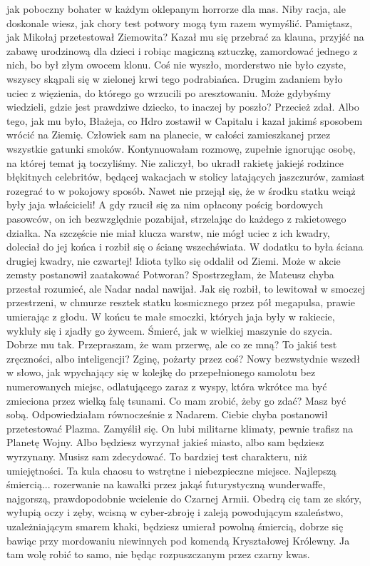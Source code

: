 \begin{dialogue}
jak poboczny bohater w każdym oklepanym horrorze dla mas.
\ds{} Niby racja, ale doskonale wiesz, jak chory test potwory mogą tym razem wymyślić.
Pamiętasz, jak Mikołaj przetestował Ziemowita? Kazał mu się przebrać za klauna, przyjść na zabawę urodzinową dla dzieci i robiąc magiczną sztuczkę, zamordować jednego z nich, bo był złym owocem klonu.
Coś nie wyszło, morderstwo nie było czyste, wszyscy skąpali się w zielonej krwi tego podrabiańca.
Drugim zadaniem było uciec z więzienia, do którego go wrzucili po aresztowaniu. Może gdybyśmy wiedzieli, gdzie jest prawdziwe dziecko, to inaczej by poszło?
\ds{} Przecież zdał.
\ds{} Albo tego, jak mu było, Błażeja, co Hdro zostawił w Capitalu i kazał jakimś sposobem wrócić na Ziemię.
Człowiek sam na planecie, w całości zamieszkanej przez wszystkie gatunki smoków.
\dm{} Kontynuowałam rozmowę, zupełnie ignorując osobę, na której temat ją toczyliśmy.
\ds{} Nie zaliczył, bo ukradł rakietę jakiejś rodzince błękitnych celebritów, będącej wakacjach w stolicy latających jaszczurów, zamiast rozegrać to w pokojowy sposób. 
Nawet nie przejął się, że w środku statku wciąż były jaja właścicieli!
A gdy rzucił się za nim opłacony pościg bordowych pasowców, on ich bezwzględnie pozabijał, strzelając do każdego z rakietowego działka.
Na szczęście nie miał klucza warstw, nie mógł uciec z ich kwadry, doleciał do jej końca i rozbił się o ścianę wszechświata. 
W dodatku to była ściana drugiej kwadry, nie czwartej! 
Idiota tylko się oddalił od Ziemi. Może w akcie zemsty postanowił zaatakować Potworan?
\dm{} Spostrzegłam, że Mateusz chyba przestał rozumieć, ale Nadar nadal nawijał. \dm{}
Jak się rozbił, to lewitował w smoczej przestrzeni, w chmurze resztek statku kosmicznego przez pół megapulsa, prawie umierając z głodu.
W końcu te małe smoczki, których jaja były w rakiecie, wykluły się i zjadły go żywcem. Śmierć, jak w wielkiej maszynie do szycia.
Dobrze mu tak.
\ds{} Przepraszam, że wam przerwę, ale co ze mną? To jakiś test zręczności, albo inteligencji? 
Zginę, pożarty przez coś? \dm{} Nowy bezwstydnie wszedł w słowo, jak wpychający się w kolejkę do przepełnionego samolotu bez numerowanych miejsc, 
odlatującego zaraz z wyspy, która wkrótce ma być zmieciona przez wielką falę tsunami.
\dm{} Co mam zrobić, żeby go zdać?
\ds{} Masz być sobą. \dm{} Odpowiedziałam równocześnie z Nadarem.
\ds{} Ciebie chyba postanowił przetestować Plazma. \dm{} Zamyślił się. \dm{} On lubi militarne klimaty, pewnie trafisz na Planetę Wojny.
Albo będziesz wyrzynał jakieś miasto, albo sam będziesz wyrzynany. Musisz sam zdecydować.
To bardziej test charakteru, niż umiejętności. Ta kula chaosu to wstrętne i niebezpieczne miejsce.
Najlepszą śmiercią... rozerwanie na kawałki przez jakąś futurystyczną wunderwaffe, najgorszą, prawdopodobnie wcielenie do Czarnej Armii.
Obedrą cię tam ze skóry, wyłupią oczy i zęby, wcisną w cyber-zbroję i zaleją powodującym szaleństwo, uzależniającym smarem khaki, 
będziesz umierał powolną śmiercią, dobrze się bawiąc przy mordowaniu niewinnych pod komendą Kryształowej Królewny.
Ja tam wolę robić to samo, nie będąc rozpuszczanym przez czarny kwas.
\end{dialogue}

